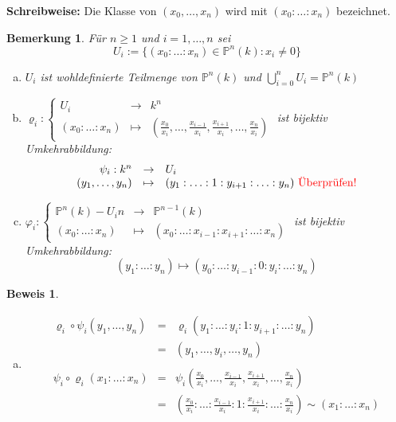\documentclass[a4paper,12pt]{report}
\theoremstyle{break}
\newtheorem{Bem}[Def]{Bemerkung}
\theoremstyle{nonumberbreak}
\newtheorem{Bew}{Beweis}
\theoremstyle{nonumberplain}
\newcommand{\linetitle}[1]{\textbf{#1}}
\newcommand{\IP}{\mathbb{P}}%
\begin{document}
\linetitle{Schreibweise:} Die Klasse von $(x_0,\dots ,x_n)$ wird mit $(x_0:\ldots :x_n)$ bezeichnet.

\begin{Bem}
F\"ur $n\ge1$ und $i=1,\dots ,n$ sei
	\[U_i:=\{ (x_0:\ldots :x_n)\in \IP^n(k):x_i\not=0\}\]
\begin{enumerate}[a)]
\item
	$U_i$ ist wohldefinierte Teilmenge von $\IP^n(k)$ und $\bigcup\limits_{i=0}^n U_i=\IP^n(k)$

\item
	$\varrho_i: \left\{ \begin{array}{rcl}
		U_i &\to& k^n\\
		(x_0:\ldots :x_n) &\mapsto& (\frac{x_0}{x_i}, \dots ,\frac{x_{i-1}}{x_i}, \frac{x_{i+1}}{x_i}, \dots , \frac{x_n}{x_i})
	\end{array} \right.$ ist bijektiv\\
	Umkehrabbildung:
		\[\begin{array}{rcl} 
			\psi_i:k^n &\to& U_i\\
			(y_1,\dots , y_n) &\mapsto& (y_1:\ldots :1:y_{i+1}:\ldots:y_n) \textrm{ \textcolor{red}{\"Uberpr\"ufen!}}
		\end{array}\]
		
\item
	$\varphi_i: \left\{ \begin{array}{rcl}
		\IP^n(k)-U_in &\to& \IP^{n-1}(k)\\
		(x_0:\ldots :x_n) &\mapsto& (x_0: \ldots: x_{i-1}: x_{i+1}: \ldots: x_n)
	\end{array} \right.$ ist bijektiv\\
	Umkehrabbildung:
		\[ (y_1: \ldots: y_n) \mapsto (y_0:\ldots:y_{i-1}:0:y_i:\ldots:y_n)\]
\end{enumerate}\end{Bem}

\begin{Bew}\begin{enumerate}[a)]\item[b)]
\[\begin{array}{rcl}
	\varrho_i\circ\psi_i(y_1,\dots ,y_n) &=&\varrho_i(y_1:\ldots:y_i:1:y_{i+1}:\ldots:y_n )\\
	&=& (y_1,\dots ,y_i,\dots ,y_n)\\ &&\\
	\psi_i\circ\varrho_i(x_1:\ldots:x_n)  &=& \psi_i(\frac{x_0}{x_i},\dots ,\frac{x_{i-1}}{x_i},\frac{x_{i+1}}{x_i},\dots ,\frac{x_n}{x_i})\\
	&=& (\frac{x_0}{x_i}:\ldots :\frac{x_{i-1}}{x_i}:1:\frac{x_{i+1}}{x_i}:\ldots :\frac{x_n}{x_i})\sim(x_1:\ldots:x_n )
\end{array}\]
\end{enumerate}\end{Bew}
\end{document}
